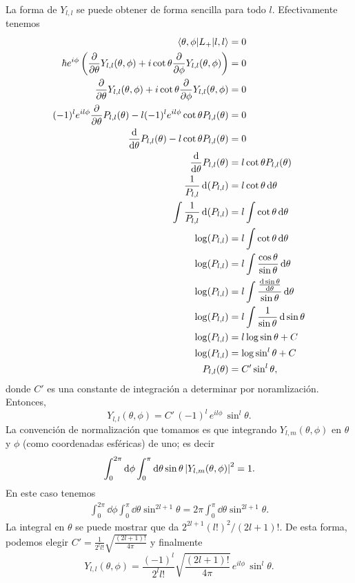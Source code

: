 \documentclass[10pt, a4paper]{article}
\newcommand{\Ylm}{Y_{l,m}}
\newcommand{\Ylmev}[2]{Y_{#1,#2}}
\newcommand{\Plmev}[2]{P_{#1,#2}}
\numberwithin{equation}{subsection}
\begin{document}
\bigbreak

La forma de $\Ylmev{l}{l}$ se puede obtener de forma sencilla para todo $l$.
Efectivamente tenemos
\begin{align}
  \matrixel{\theta,\phi}{L_+}{l,l} &= 0 \\
  \hbar e^{i\phi} \left(\pdv{\theta}\Ylmev{l}{l}(\theta,\phi) +
    i\cot\theta\pdv{\phi}\Ylmev{l}{l}(\theta,\phi)\right) &= 0 \\
  \pdv{\theta}\Ylmev{l}{l}(\theta,\phi) +
    i\cot\theta\pdv{\phi}\Ylmev{l}{l}(\theta,\phi) &= 0 \\
  (-1)^l e^{il\phi} \pdv{\theta}\Plmev{l}{l}(\theta) -
    l(-1)^l e^{il\phi} \cot\theta\Plmev{l}{l}(\theta) &= 0 \\
  \dv{\theta}\Plmev{l}{l}(\theta) -
    l\cot\theta\Plmev{l}{l}(\theta) &= 0 \\
  \dv{\theta}\Plmev{l}{l}(\theta) &=
    l\cot\theta\Plmev{l}{l}(\theta) \\
  \frac{1}{\Plmev{l}{l}}\dd(\Plmev{l}{l})
    &= l\cot\theta \dd{\theta} \nonumber \\
  \int\frac{1}{\Plmev{l}{l}}\dd(\Plmev{l}{l})
    &= l\int\cot\theta \dd{\theta} \nonumber \\
  \log(\Plmev{l}{l})
    &= l\int\cot\theta \dd{\theta} \nonumber \\
  \log(\Plmev{l}{l})
    &= l\int\frac{\cos\theta}{\sin\theta} \dd{\theta} \nonumber \\
  \log(\Plmev{l}{l})
    &= l\int\frac{\dv{\sin\theta}{\theta}}{\sin\theta} \dd{\theta} \nonumber \\
  \log(\Plmev{l}{l})
    &= l\int\frac{1}{\sin\theta} \dd{\sin\theta} \nonumber \\
  \log(\Plmev{l}{l})
    &= l\log\sin\theta + C \nonumber \\
  \log(\Plmev{l}{l})
    &= \log\sin^l\theta + C \nonumber \\
  \Plmev{l}{l}(\theta)
    &= C'\sin^l\theta,
\end{align}
donde $C'$ es una constante de integración a determinar por noramlización.
Entonces,
\begin{equation}
  \Ylmev{l}{l}(\theta,\phi) = C'\,(-1)^l\,e^{il\phi}\,\sin^l\theta.
\end{equation}
La convención de normalización que tomamos es que integrando
$\Ylm(\theta,\phi)$ en $\theta$ y $\phi$ (como coordenadas esféricas) de uno;
es decir
\begin{equation}
  \int_{0}^{2\pi}\dd{\phi}
    \int_{0}^{\pi}\dd{\theta}\sin\theta\,\abs{\Ylm(\theta,\phi)}^2
    = 1.
\end{equation}
En este caso tenemos
\begin{align}
  \int_{0}^{2\pi}\dd{\phi}\int_{0}^{\pi}\dd{\theta}\sin^{2l+1}\theta =
  2\pi\int_{0}^{\pi}\dd{\theta}\sin^{2l+1}\theta.
\end{align}
La integral en $\theta$ se puede mostrar que da $2^{2l+1}(l!)^2/(2l+1)!$. De
esta forma, podemos elegir $C' = \frac{1}{2^l l!}\sqrt{\frac{(2l+1)!}{4\pi}}$ y
finalmente
\begin{equation}
  \Ylmev{l}{l}(\theta,\phi) = \frac{(-1)^l}{2^l l!}
    \sqrt{\frac{(2l+1)!}{4\pi}}\,e^{il\phi}\,\sin^l\theta.
\end{equation}
\end{document}
